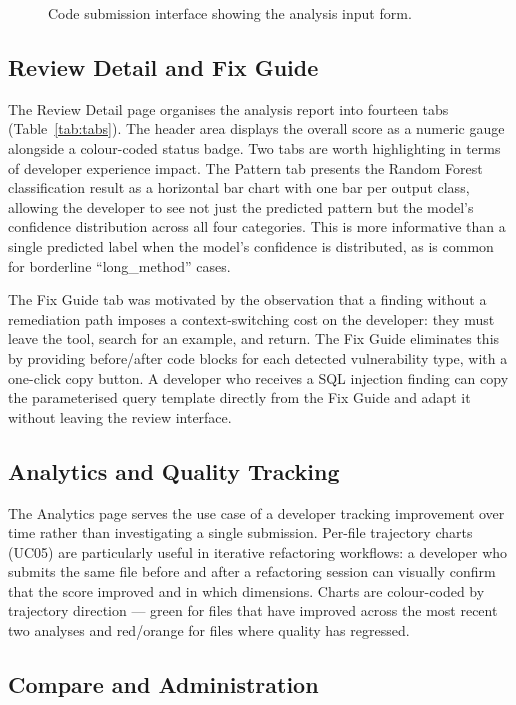 \documentclass[12pt, oneside]{report}
\begin{document}
\begin{figure}[H]
{\begin{tikzpicture}[font=\sffamily\normalsize, thick]
\end{tikzpicture}%
}
\caption{Code submission interface showing the analysis input form.}
\label{fig:submit}
\end{figure}

\subsection{Review Detail and Fix Guide}

The Review Detail page organises the analysis report into fourteen tabs
(Table~\ref{tab:tabs}). The header area displays the overall score as a numeric gauge
alongside a colour-coded status badge. Two tabs are worth highlighting in terms of
developer experience impact. The Pattern tab presents the Random Forest classification
result as a horizontal bar chart with one bar per output class, allowing the developer
to see not just the predicted pattern but the model's confidence distribution across
all four categories. This is more informative than a single predicted label when the
model's confidence is distributed, as is common for borderline ``long\_method'' cases.

The Fix Guide tab was motivated by the observation that a finding without a remediation
path imposes a context-switching cost on the developer: they must leave the tool, search
for an example, and return. The Fix Guide eliminates this by providing before/after
code blocks for each detected vulnerability type, with a one-click copy button. A
developer who receives a SQL injection finding can copy the parameterised query
template directly from the Fix Guide and adapt it without leaving the review interface.

\subsection{Analytics and Quality Tracking}

The Analytics page serves the use case of a developer tracking improvement over time
rather than investigating a single submission. Per-file trajectory charts (UC05) are
particularly useful in iterative refactoring workflows: a developer who submits the
same file before and after a refactoring session can visually confirm that the score
improved and in which dimensions. Charts are colour-coded by trajectory direction ---
green for files that have improved across the most recent two analyses and red/orange
for files where quality has regressed.

\subsection{Compare and Administration}
\end{document}
